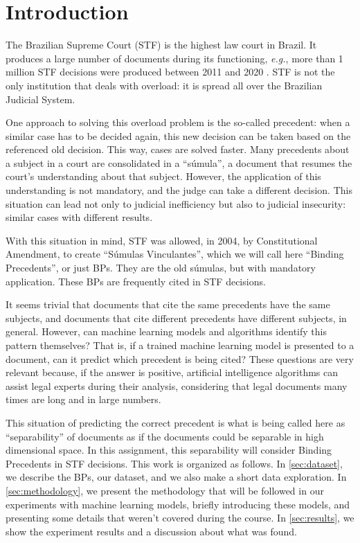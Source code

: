 \section{Introduction}

    The Brazilian Supreme Court (STF) is the highest law court in Brazil. It produces a large number of documents during its functioning, \textit{e.g.}, more than 1 million STF decisions were produced between 2011 and 2020 \cite{stf}. STF is not the only institution that deals with overload: it is spread all over the Brazilian Judicial System.

    One approach to solving this overload problem is the so-called precedent: when a similar case has to be decided again, this new decision can be taken based on the referenced old decision. This way, cases are solved faster. Many precedents about a subject in a court are consolidated in a ``súmula'', a document that resumes the court's understanding about that subject. However, the application of this understanding is not mandatory, and the judge can take a different decision. This situation can lead not only to judicial inefficiency but also to judicial insecurity: similar cases with different results.

    With this situation in mind, STF was allowed, in 2004, by Constitutional Amendment, to create ``Súmulas Vinculantes'', which we will call here ``Binding Precedents'', or just BPs. They are the old súmulas, but with mandatory application. These BPs are frequently cited in STF decisions.

    It seems trivial that documents that cite the same precedents have the same subjects, and documents that cite different precedents have different subjects, in general. However, can machine learning models and algorithms identify this pattern themselves? That is, if a trained machine learning model is presented to a document, can it predict which precedent is being cited? These questions are very relevant because, if the answer is positive, artificial intelligence algorithms can assist legal experts during their analysis, considering that legal documents many times are long and in large numbers.

    This situation of predicting the correct precedent is what is being called here as ``separability'' of documents as if the documents could be separable in high dimensional space. In this assignment, this separability will consider Binding Precedents in STF decisions. This work is organized as follows. In \autoref{sec:dataset}, we describe the BPs, our dataset, and we also make a short data exploration. In \autoref{sec:methodology}, we present the methodology that will be followed in our experiments with machine learning models, briefly introducing these models, and presenting some details that weren't covered during the course. In \autoref{sec:results}, we show the experiment results and a discussion about what was found.
